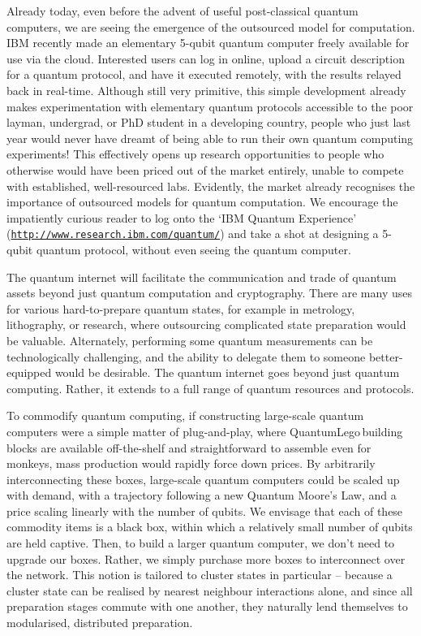 \documentclass[aps, rmp, twocolumn, amsmath, amssymb, nofootinbib, superscriptaddress, longbibliography, floatfix, table-of-contents, eqsecnum]{revtex4-1}
\begin{document}
Already today, even before the advent of useful post-classical quantum computers, we are seeing the emergence of the outsourced model for computation. IBM recently made an elementary 5-qubit quantum computer freely available for use via the cloud. Interested users can log in online, upload a circuit description for a quantum protocol, and have it executed remotely, with the results relayed back in real-time. Although still very primitive, this simple development already makes experimentation with elementary quantum protocols accessible to the poor layman, undergrad, or PhD student in a developing country, people who just last year would never have dreamt of being able to run their own quantum computing experiments! This effectively opens up research opportunities to people who otherwise would have been priced out of the market entirely, unable to compete with established, well-resourced labs. Evidently, the market already recognises the importance of outsourced models for quantum computation. We encourage the impatiently curious reader to log onto the `IBM Quantum Experience' (\texttt{\href{http://www.research.ibm.com/quantum/}{http://www.research.ibm.com/quantum/}}) and take a shot at designing a 5-qubit quantum protocol, without even seeing the quantum computer.

The quantum internet will facilitate the communication and trade of quantum assets beyond just quantum computation and cryptography. There are many uses for various hard-to-prepare quantum states, for example in metrology, lithography, or research, where outsourcing complicated state preparation would be valuable. Alternately, performing some quantum measurements can be technologically challenging, and the ability to delegate them to someone better-equipped would be desirable. The quantum internet goes beyond just quantum computing. Rather, it extends to a full range of quantum resources and protocols. 

To commodify quantum computing, if constructing large-scale quantum computers were a simple matter of plug-and-play, where QuantumLego\texttrademark \,building blocks are available off-the-shelf and straightforward to assemble even for monkeys, mass production would rapidly force down prices. By arbitrarily interconnecting these boxes, large-scale quantum computers could be scaled up with demand, with a trajectory following a new Quantum Moore's Law, and a price scaling linearly with the number of qubits. We envisage that each of these commodity items is a black box, within which a relatively small number of qubits are held captive. Then, to build a larger quantum computer, we don't need to upgrade our boxes. Rather, we simply purchase more boxes to interconnect over the network. This notion is tailored to cluster states in particular -- because a cluster state can be realised by nearest neighbour interactions alone, and since all preparation stages commute with one another, they naturally lend themselves to modularised, distributed preparation.
\end{document}
